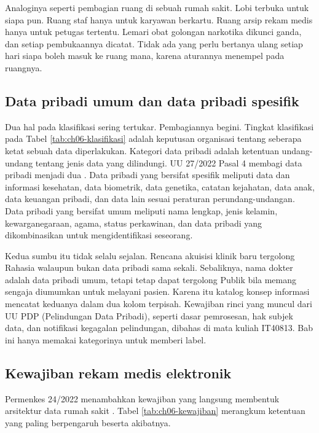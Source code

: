 Analoginya seperti pembagian ruang di sebuah rumah sakit. Lobi terbuka untuk
siapa pun. Ruang staf hanya untuk karyawan berkartu. Ruang arsip rekam medis
hanya untuk petugas tertentu. Lemari obat golongan narkotika dikunci ganda,
dan setiap pembukaannya dicatat. Tidak ada yang perlu bertanya ulang setiap
hari siapa boleh masuk ke ruang mana, karena aturannya menempel pada ruangnya.

\subsection*{Data pribadi umum dan data pribadi spesifik}

Dua hal pada klasifikasi sering tertukar. Pembagiannya begini. Tingkat
klasifikasi pada Tabel \ref{tab:ch06-klasifikasi} adalah keputusan organisasi
tentang seberapa ketat sebuah data diperlakukan. Kategori data pribadi adalah
ketentuan undang-undang tentang jenis data yang dilindungi. UU 27/2022 Pasal 4
membagi data pribadi menjadi dua \cite{uu27-2022-pdp}. Data pribadi yang
bersifat spesifik meliputi data dan informasi kesehatan, data biometrik, data
genetika, catatan kejahatan, data anak, data keuangan pribadi, dan data lain
sesuai peraturan perundang-undangan. Data pribadi yang bersifat umum meliputi
nama lengkap, jenis kelamin, kewarganegaraan, agama, status perkawinan, dan
data pribadi yang dikombinasikan untuk mengidentifikasi seseorang.

Kedua sumbu itu tidak selalu sejalan. Rencana akuisisi klinik baru tergolong
Rahasia walaupun bukan data pribadi sama sekali. Sebaliknya, nama dokter adalah
data pribadi umum, tetapi tetap dapat tergolong Publik bila memang sengaja
diumumkan untuk melayani pasien. Karena itu katalog konsep informasi mencatat
keduanya dalam dua kolom terpisah. Kewajiban rinci yang muncul dari UU PDP
(Pelindungan Data Pribadi), seperti dasar pemrosesan, hak subjek data, dan
notifikasi kegagalan pelindungan, dibahas di mata kuliah IT40813. Bab ini
hanya memakai kategorinya untuk memberi label.

\subsection*{Kewajiban rekam medis elektronik}

Permenkes 24/2022 menambahkan kewajiban yang langsung membentuk arsitektur
data rumah sakit \cite{permenkes24-2022}. Tabel \ref{tab:ch06-kewajiban}
merangkum ketentuan yang paling berpengaruh beserta akibatnya.

